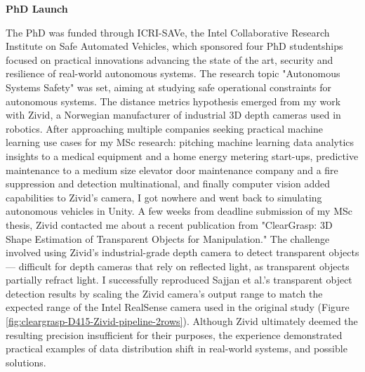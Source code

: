 \textbf{PhD Launch}

The PhD was funded through ICRI-SAVe, the Intel Collaborative Research Institute on Safe Automated Vehicles, which sponsored four PhD studentships focused on practical innovations advancing the state of the art, security and resilience of real-world autonomous systems. The research topic "Autonomous Systems Safety" was set, aiming at studying safe operational constraints for autonomous systems.
The distance metrics hypothesis emerged from my work with Zivid, a Norwegian manufacturer of industrial 3D depth cameras used in robotics. After approaching multiple companies seeking practical machine learning use cases for my MSc research: pitching machine learning data analytics insights to a medical equipment and a home energy metering start-ups, predictive maintenance to a medium size elevator door maintenance company and a fire suppression and detection multinational, and finally computer vision added capabilities to Zivid's camera, I got nowhere and went back to simulating autonomous vehicles in Unity. A few weeks from deadline submission of my MSc thesis, Zivid contacted me about a recent publication from \cite{sajjan2019cleargrasp3dshapeestimation} "ClearGrasp: 3D Shape Estimation of Transparent Objects for Manipulation." The challenge involved using Zivid's industrial-grade depth camera to detect transparent objects — difficult for depth cameras that rely on reflected light, as transparent objects partially refract light.
I successfully reproduced Sajjan et al.'s transparent object detection results by scaling the Zivid camera's output range to match the expected range of the Intel RealSense camera used in the original study (Figure \ref{fig:cleargrasp-D415-Zivid-pipeline-2rows}). Although Zivid ultimately deemed the resulting precision insufficient for their purposes, the experience demonstrated practical examples of data distribution shift in real-world systems, and possible solutions.

